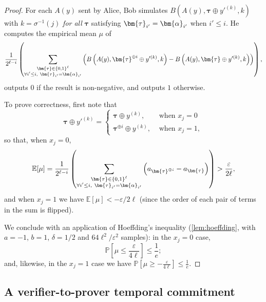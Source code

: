 \documentclass[10pt,a4paper]{article}
\theoremstyle{definition}
\newcommand{\E}{\mathbb E}
\renewcommand{\P}{\mathbb P}
\newcommand{\eps}{\varepsilon}
\newcommand{\bitset}{\{0,1\}}
\newcommand{\pcommitstring}{y}
\def\fe#1{
    \ifnum#1=1
        \alpha
    \else
    \ifnum#1=2
        \beta
    \else
    \ifnum#1=3
        \gamma
    \fi\fi\fi
}
\begin{document}
\begin{proof}
    For each $A(\pcommitstring)$ sent by Alice, Bob simulates $B\left(A(\pcommitstring), \bm{\tau} \oplus \pcommitstring'^{(k)}, k\right)$ with $k = \sigma^{-1}(j)$ \emph{for all} $\bm{\tau}$ satisfying  $\bm{\tau}_{i'} = \bm{\fe1}_{i'}$ when $i' \leq i$. He computes the empirical mean $\mu$ of
    \begin{equation*}
        \frac1{2^{\ell - i}}\left(\sum_{\substack{\bm{\tau} \in \bitset^{\ell} \\ \forall i' \leq i, ~ \bm{\tau}_{i'} = \bm{\fe1}_{i'}}} \left(B\left(A(\pcommitstring), \bm{\tau}^{\oplus i} \oplus \pcommitstring'^{(k)}, k\right) - B\left(A(\pcommitstring), \bm{\tau} \oplus \pcommitstring'^{(k)}, k\right)\right)\right),
    \end{equation*}
    outputs $0$ if the result is non-negative, and outputs $1$ otherwise.
    
    To prove correctness, first note that
    \begin{equation*}
        \bm{\tau} \oplus \pcommitstring'^{(k)} = \left\{\begin{array}{ll}\bm{\tau} \oplus \pcommitstring^{(k)}, & \text{ when } x_j = 0\\\bm{\tau}^{\oplus i} \oplus \pcommitstring^{(k)}, & \text{ when } x_j = 1,\end{array}\right.
    \end{equation*}
    so that, when $x_j = 0$,
    \begin{equation*}
        \E[\mu] = \frac1{2^{\ell - i}}\left(\sum_{\substack{\bm{\tau} \in \bitset^{\ell} \\ \forall i' \leq i, ~ \bm{\tau}_{i'} = \bm{\fe1}_{i'}}} \left(a_{\bm{\tau}^{\oplus i}} - a_{\bm{\tau}}\right)\right) > \frac{\eps}{2\ell},
    \end{equation*}
    and when $x_j = 1$ we have $\E[\mu] < -\eps/2\ell$ (since the order of each pair of terms in the sum is flipped).
    
    We conclude with an application of Hoeffding's inequality (\cref{lem:hoeffding}, with $a = -1$, $b = 1$, $\delta = 1/2$ and $64 \ell^2/\eps^2$ samples): in the $x_j = 0$ case,
    \begin{equation*}
        \P\left[\mu \leq \frac{\eps}{4\ell}\right] \leq \frac1 e;
    \end{equation*}
    and, likewise, in the $x_j = 1$ case we have $\P\left[\mu \geq -\frac{\eps}{4\ell}\right] \leq \frac1 e$.
\end{proof}

\subsection{A verifier-to-prover temporal commitment}
\label{sec:vp-commitment}
\end{document}
